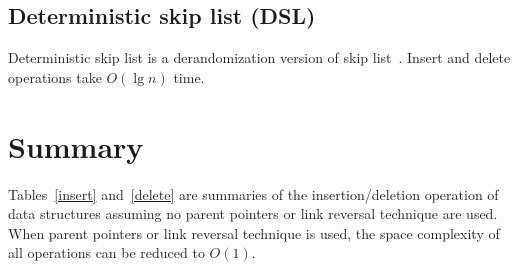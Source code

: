 \subsection{Deterministic skip list (DSL)}
Deterministic skip list is a derandomization version of skip list~\cite{Munro1992}. Insert and delete operations take $O(\lg n)$ time.

\section{Summary}
Tables~\ref{insert} and~\ref{delete} are summaries of the insertion/deletion operation of data structures assuming no parent pointers or link reversal technique are used. When parent pointers or link reversal technique is used, the space complexity of all operations can be reduced to $O(1)$.

